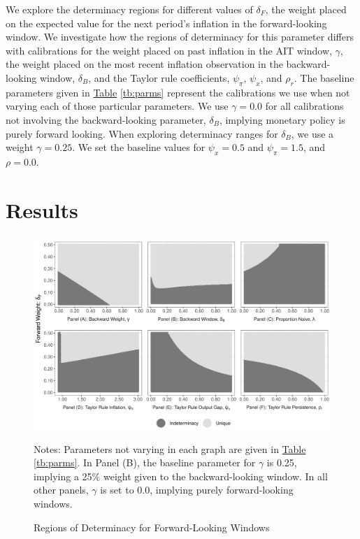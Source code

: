 \documentclass[english,authoryear,12pt]{elsarticle}
\begin{document}
We explore the determinacy regions for different values of $\delta_F$, the weight placed on the expected value for the next period's inflation in the forward-looking window. We investigate how the regions of determinacy for this parameter differs with calibrations for the weight placed on past inflation in the AIT window, $\gamma$, the weight placed on the most recent inflation observation in the backward-looking window, $\delta_B$, and the Taylor rule coefficients, $\psi_\pi$, $\psi_x$, and $\rho_r$. The baseline parameters given in \href{tb:parms}{Table} \ref{tb:parms} represent the calibrations we use when not varying each of those particular parameters. We use $\gamma=0.0$ for all calibrations not involving the backward-looking parameter, $\delta_B$, implying monetary policy is purely forward looking. When exploring determinacy ranges for $\delta_B$, we use a weight $\gamma=0.25$. We set the baseline values for $\psi_x=0.5$ and $\psi_\pi = 1.5$, and $\rho=0.0$.

\section{Results}

\begin{figure}
	\captionsetup{justification=centering}
	\begin{center}
		\includegraphics[width=\textwidth]{./determinacy_notitle.png}
		\vspace*{3pc}\hspace*{2pc}\parbox{0.9\textwidth}{\small{
			Notes: Parameters not varying in each graph are given in \href{tb:parms}{Table} \ref{tb:parms}. In Panel (B), the baseline parameter for $\gamma$ is 0.25, implying a 25\% weight given to the backward-looking window. In all other panels, $\gamma$ is set to 0.0, implying purely forward-looking windows.}
		}
	\end{center}
	\vspace*{-4pc}\caption{Regions of Determinacy for Forward-Looking Windows}\label{fg:determinacy}
\end{figure}
\end{document}
